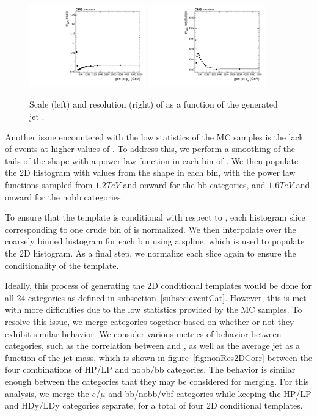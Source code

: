 \begin{figure}[htbp]
  \centering
  \includegraphics[width=0.45\textwidth]{fig/2Dfit/detectorParam_nonRes_scale_MVV.pdf}
  \includegraphics[width=0.45\textwidth]{fig/2Dfit/detectorParam_nonRes_resolution_MVV.pdf}
  \caption{
    Scale (left) and resolution (right) of \MVV as a function of the generated jet \pt.
  }
  \label{fig:nonResScaleResMVV}
\end{figure}

Another issue encountered with the low statistics of the MC samples is the lack of events at higher values of \MVV.
To address this, we perform a smoothing of the tails of the \MVV shape with a power law function in each bin of \MJ.
We then populate the 2D histogram with values from the \MVV shape in each \MJ bin, with the power law functions sampled from $1.2\unit{TeV}$ and onward for the bb categories, and $1.6\unit{TeV}$ and onward for the nobb categories.

To ensure that the template is conditional with respect to \MJ, each histogram slice corresponding to one crude bin of \MJ is normalized.
We then interpolate over the coarsely binned \MJ histogram for each \MVV bin using a spline, which is used to populate the 2D histogram.
As a final step, we normalize each \MJ slice again to ensure the conditionality of the template.

Ideally, this process of generating the 2D conditional templates would be done for all 24 categories as defined in subsection~\ref{subsec:eventCat}.
However, this is met with more difficulties due to the low statistics provided by the MC samples.
To resolve this issue, we merge categories together based on whether or not they exhibit similar behavior.
We consider various metrics of behavior between categories, such as the correlation between \MJ and \MVV, as well as the average jet \pt as a function of the jet mass, which is shown in figure~\ref{fig:nonRes2DCorr} between the four combinations of HP/LP and nobb/bb categories.
The behavior is similar enough between the categories that they may be considered for merging.
For this analysis, we merge the $e$/$\mu$ and bb/nobb/vbf categories while keeping the HP/LP and HDy/LDy categories separate, for a total of four 2D conditional templates.

